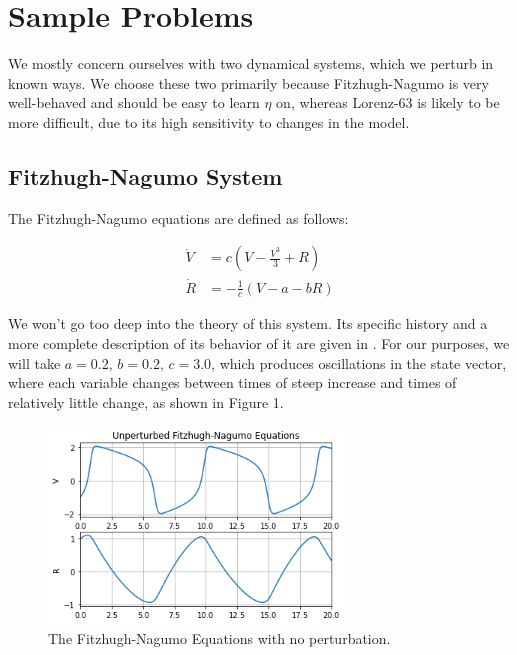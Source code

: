 \documentclass[12pt]{article}
\begin{document}




\section{Sample Problems}

We mostly concern ourselves with two dynamical systems, which we perturb in known ways. We choose these two primarily because Fitzhugh-Nagumo is very well-behaved and should be easy to learn $\eta$ on, whereas Lorenz-63 is likely to be more difficult, due to its high sensitivity to changes in the model.


\subsection{Fitzhugh-Nagumo System}

The Fitzhugh-Nagumo equations are defined as follows:

\begin{align*}
  \dot{V} &= c \left(V - \frac{V^3}{3} + R \right)\\
  \dot{R} &= -\frac{1}{c} \left( V - a - b R \right)
\end{align*}

We won't go too deep into the theory of this system. Its specific history and a more complete description of its behavior of it are given in \cite{ramsay}. For our purposes, we will take $a=0.2,\, b=0.2,\, c=3.0$, which produces oscillations in the state vector, where each variable changes between times of steep increase and times of relatively little change, as shown in Figure 1.

\begin{figure}[ht]
  \centering
  \includegraphics[width=0.7\textwidth]{fn-unperturbed.png}
  \caption{The Fitzhugh-Nagumo Equations with no perturbation.}
\end{figure}
\end{document}
